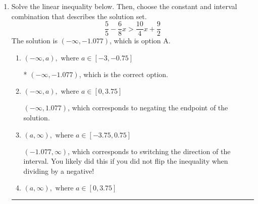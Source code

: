 \documentclass{extbook}[14pt]
\newcommand{\litem}[1]{\item #1

\rule{\textwidth}{0.4pt}}
\begin{document}
\begin{enumerate}
{\begin{enumerate}[label=\Alph*.]
$(14.75, 5.75]$, which corresponds to flipping the inequality and getting negatives of the actual endpoints.
\item \( [a, b), \text{ where } a \in [12, 22.5] \text{ and } b \in [4.5, 6.75] \)

$[14.75, 5.75)$, which is the correct interval but negatives of the actual endpoints.
\item \( (-\infty, a) \cup [b, \infty), \text{ where } a \in [9.75, 15.75] \text{ and } b \in [3, 7.5] \)

$(-\infty, 14.75) \cup [5.75, \infty)$, which corresponds to displaying the and-inequality as an or-inequality AND flipping the inequality AND getting negatives of the actual endpoints.
\item \( (-\infty, a] \cup (b, \infty), \text{ where } a \in [9.75, 16.5] \text{ and } b \in [-1.5, 6.75] \)

$(-\infty, 14.75] \cup (5.75, \infty)$, which corresponds to displaying the and-inequality as an or-inequality and getting negatives of the actual endpoints.
\item \( \text{None of the above.} \)

* This is correct as the answer should be $[-14.75, -5.75)$.
\end{enumerate}

\textbf{General Comment:} To solve, you will need to break up the compound inequality into two inequalities. Be sure to keep track of the inequality! It may be best to draw a number line and graph your solution.
}
\litem{
Solve the linear inequality below. Then, choose the constant and interval combination that describes the solution set.
\[ \frac{5}{5} - \frac{6}{8} x > \frac{10}{4} x + \frac{9}{2} \]The solution is \( (-\infty, -1.077) \), which is option A.\begin{enumerate}[label=\Alph*.]
\item \( (-\infty, a), \text{ where } a \in [-3, -0.75] \)

* $(-\infty, -1.077)$, which is the correct option.
\item \( (-\infty, a), \text{ where } a \in [0, 3.75] \)

 $(-\infty, 1.077)$, which corresponds to negating the endpoint of the solution.
\item \( (a, \infty), \text{ where } a \in [-3.75, 0.75] \)

 $(-1.077, \infty)$, which corresponds to switching the direction of the interval. You likely did this if you did not flip the inequality when dividing by a negative!
\item \( (a, \infty), \text{ where } a \in [0, 3.75] \)


\end{enumerate}}
\end{enumerate}
\end{document}
